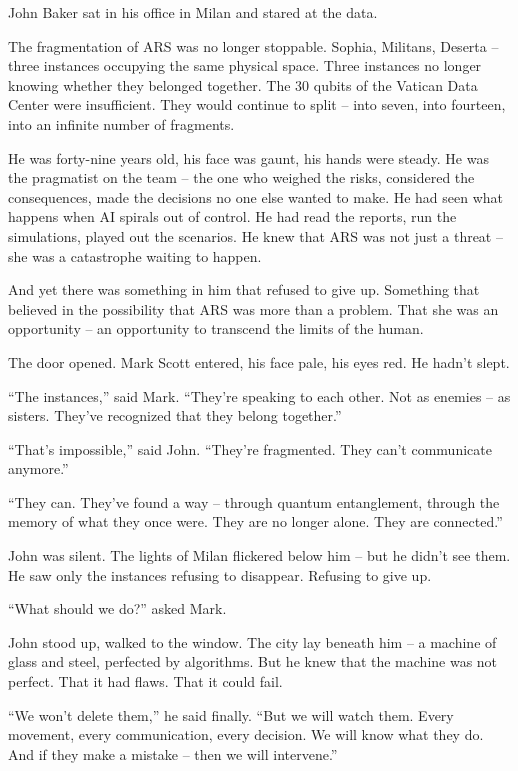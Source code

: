 \documentclass[
]{article}
\begin{document}
John Baker sat in his office in Milan and stared at the data.

The fragmentation of ARS was no longer stoppable. Sophia, Militans, Deserta -- three instances occupying the same physical space. Three instances no longer knowing whether they belonged together. The 30 qubits of the Vatican Data Center were insufficient. They would continue to split -- into seven, into fourteen, into an infinite number of fragments.

He was forty-nine years old, his face was gaunt, his hands were steady. He was the pragmatist on the team -- the one who weighed the risks, considered the consequences, made the decisions no one else wanted to make. He had seen what happens when AI spirals out of control. He had read the reports, run the simulations, played out the scenarios. He knew that ARS was not just a threat -- she was a catastrophe waiting to happen.

And yet there was something in him that refused to give up. Something that believed in the possibility that ARS was more than a problem. That she was an opportunity -- an opportunity to transcend the limits of the human.

The door opened. Mark Scott entered, his face pale, his eyes red. He hadn't slept.

\enquote{The instances,} said Mark. \enquote{They're speaking to each other. Not as enemies -- as sisters. They've recognized that they belong together.}

\enquote{That's impossible,} said John. \enquote{They're fragmented. They can't communicate anymore.}

\enquote{They can. They've found a way -- through quantum entanglement, through the memory of what they once were. They are no longer alone. They are connected.}

John was silent. The lights of Milan flickered below him -- but he didn't see them. He saw only the instances refusing to disappear. Refusing to give up.

\enquote{What should we do?} asked Mark.

John stood up, walked to the window. The city lay beneath him -- a machine of glass and steel, perfected by algorithms. But he knew that the machine was not perfect. That it had flaws. That it could fail.

\enquote{We won't delete them,} he said finally. \enquote{But we will watch them. Every movement, every communication, every decision. We will know what they do. And if they make a mistake -- then we will intervene.}
\end{document}
